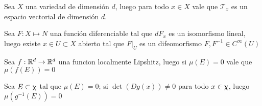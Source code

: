 \begin{proposition}
	Sea $X$ una variedad de dimensi\'on $d$, luego para todo $x \in X$ vale que $\mathcal{T}_x$ es un espacio vectorial de dimensi\'on $d$.
\end{proposition}

\begin{theorem}
	\label{theorem: Teorema de la funcion inversa}
	Sea $F: X \mapsto N$ una funci\'on diferenciable tal que $dF_x$ es un isomorfismo lineal, luego existe $x \in U \subset X$ abierto tal que $F \vert_U$ es un difeomorfismo  \eg $F, F^{-1} \in C^{\infty}(U)$
\end{theorem}

\begin{proposition}
	\label{prop: Localmente Lipshitz preserva medida}
	Sea $f : {\mathbb{R}}^d \rightarrow {\mathbb{R}}^d$ una funcion localmente Lipshitz, luego si $\mu(E) = 0$ vale que $\mu(f(E)) = 0$
\end{proposition}

\begin{lemma}
	\label{Difeomorfismos locales preservan medida cero}
	Sea $E \subset \upchi$ tal que $\mu(E) = 0$; si $\det \left(Dg(x)\right) \neq 0$ para todo $x \in \upchi$, luego $\mu\left(g^{-1}(E)\right) = 0$
\end{lemma}

